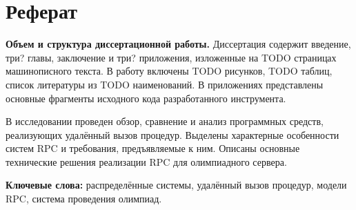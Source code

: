 \chapter*{Реферат}
\textbf{Объем и структура диссертационной работы.}
Диссертация содержит введение, три? главы, заключение и три? приложения,
изложенные на TODO страницах машинописного текста.
В работу включены TODO рисунков, TODO таблиц,
список литературы из TODO наименований.
В приложениях представлены основные фрагменты исходного кода
разработанного инструмента.

В исследовании проведен обзор, сравнение и анализ программных средств,
реализующих удалённый вызов процедур.
Выделены характерные особенности систем RPC и требования, предъявляемые к ним.
Описаны основные технические решения реализации RPC для олимпиадного сервера.

\textbf{Ключевые слова:}
распределённые системы,
удалённый вызов процедур,
модели RPC,
система проведения олимпиад.

